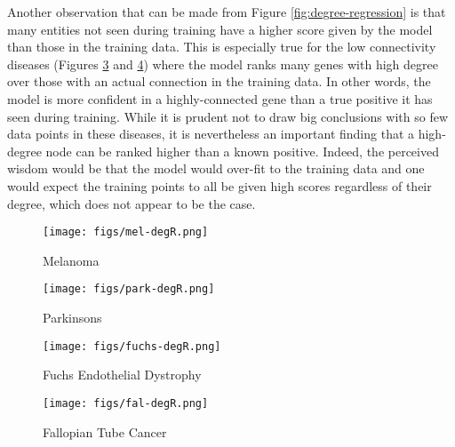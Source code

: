 Another observation that can be made from Figure \ref{fig:degree-regression} is that many entities not seen during training have a higher score given by the model than those in the training data. This is especially true for the low connectivity diseases (Figures \ref{fig:dr:fuchs} and \ref{fig:dr:fal}) where the model ranks many genes with high degree over those with an actual connection in the training data. In other words, the model is more confident in a highly-connected gene than a true positive it has seen during training. While it is prudent not to draw big conclusions with so few data points in these diseases, it is nevertheless an important finding that a high-degree node can be ranked higher than a known positive. Indeed, the perceived wisdom would be that the model would over-fit to the training data and one would expect the training points to all be given high scores regardless of their degree, which does not appear to be the case.

\begin{figure*}[!ht]
	\centering
	\begin{subfigure}[b]{0.48\textwidth}
		\centering
		\texttt{[image: figs/mel-degR.png]}
		\caption{Melanoma}\label{fig:dr:mel}
	\end{subfigure}
	\begin{subfigure}[b]{0.48\textwidth}
		\centering
		\texttt{[image: figs/park-degR.png]}
		\caption{Parkinsons}\label{fig:dr:park}
	\end{subfigure}

	\begin{subfigure}[b]{0.48\textwidth}
		\centering
		\texttt{[image: figs/fuchs-degR.png]}
		\caption{Fuchs Endothelial Dystrophy}\label{fig:dr:fuchs}
	\end{subfigure}
	\begin{subfigure}[b]{0.48\textwidth}
		\centering
		\texttt{[image: figs/fal-degR.png]}
		\caption{Fallopian Tube Cancer}\label{fig:dr:fal}
	\end{subfigure}
	\caption{Relationship between gene entity degree and the score assigned to it by TransE assessing the likelihood of it associating with the given disease.}\label{fig:degree-regression}
\end{figure*}

